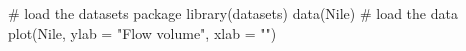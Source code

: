 \begin{Schunk}
\begin{Sinput}
 # load the datasets package
 library(datasets)
 data(Nile) # load the data
 plot(Nile, ylab = "Flow volume", xlab = "")
\end{Sinput}
\end{Schunk}
